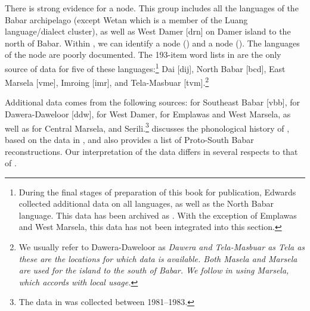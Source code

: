 There is strong evidence for a  node.
This group includes all the languages of the Babar archipelago
(except Wetan which is a member of the Luang language/dialect
cluster), as well as West Damer [drn] on Damer island to the north of Babar.
Within , we can identify a 
node () and a  node ().
The languages of the  node are poorly documented.
The 193-item word lists in \citet{Taber1993} are the only source
of data for five of these languages:\footnote{
		During the final stages of preparation of
		this book for publication, Edwards
		collected additional data on all 
		languages, as well as the North Babar language.
		This data has been archived as \citet{Edwards2023}.
		With the exception of Emplawas and West Marsela,
		this data has not been integrated into this section.}
Dai [dij], North Babar [bcd], East Marsela [vme], Imroing [imr], and Tela-Masbuar [tvm].\footnote{
		We usually
		refer to Dawera-Daweloor as \it{Dawera}
		and Tela-Masbuar as \it{Tela} as these are the locations for
		which data is available.
		Both \it{Masela} and \it{Marsela} are used for the island to
		the south of Babar.
		We follow \citeauthor{vanDijk2019} in using \it{Marsela},
		which accords with local usage.}

Additional data comes from
the following sources: \citet{Steinhauer2009} for Southeast Babar
[vbb], \citet{Chlenova2002,Chlenova2012} for Dawera-Daweloor [ddw],
\citet{ChlenovChlenova2008b} for West Damer,
\citet{Edwards2023} for Emplawas and West Marsela, as well as \citet{vanDijk2021}
			for Central Marsela, and Serili.\footnote{
			The data in \citet{vanDijk2021}
			was collected between 1981--1983.}
\citet{Zobel2018} discusses
the phonological history of ,
based on the data in \citet{Taber1993},
and also provides a list of Proto-South Babar reconstructions.
Our interpretation of the data differs in
several respects to that of \citet{Zobel2018}.

